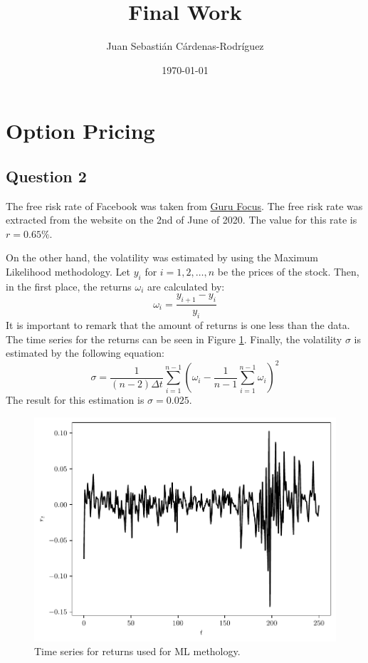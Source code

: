 \documentclass[11pt]{article}
\title{Final Work}
\author{Juan Sebasti\'an C\'ardenas-Rodríguez \\
  \scalebox{0.7}{Mathematical Engineering, Universidad EAFIT}}
\date{\today}
\theoremstyle{definition}
\theoremstyle{remark}
\theoremstyle{remark}
\begin{document}
\maketitle

\section{Option Pricing}
\subsection{Question 2}
The free risk rate of Facebook was taken from \href{https://bit.ly/30yrDY4}{Guru
  Focus}. The free risk rate was extracted from the website on the 2nd of June
of 2020. The value for this rate is $r = 0.65\%$.

On the other hand, the volatility was estimated by using the Maximum Likelihood
methodology. Let $y_{i}$ for $i = 1, 2, \ldots, n$ be the prices of the stock.
Then, in the first place, the returns $\omega_{i}$ are calculated by:
\begin{equation*}
  \omega_{i} = \frac{y_{i + 1} - y_{i}}{y_{i}}
\end{equation*}
It is important to remark that the amount of returns is one less than the data.
The time series for the returns can be seen in Figure \ref{fig:rtjs}. Finally,
the volatility $\sigma$ is estimated by the following equation:
\begin{equation*}
  \sigma = \frac{1}{(n - 2) \Delta t} \sum_{i = 1}^{n - 1}\left(\omega_{i} -
    \frac{1}{n - 1}\sum_{i=1}^{n - 1} \omega_{i}\right)^{2}
\end{equation*}
The result for this estimation is $\sigma = 0.025$.

\begin{figure}[ht]
  \centering
  \includegraphics[scale=.7]{../plts/returns_js}
  \caption{Time series for returns used for ML methology.}
  \label{fig:rtjs}
\end{figure}
\end{document}
